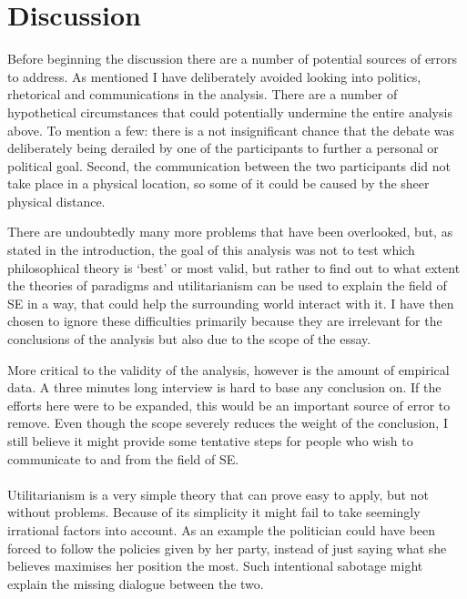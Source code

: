 \documentclass{article}
\begin{document}
\section{Discussion} \label{Discussion}
Before beginning the discussion there are a number of potential sources of errors to address. As mentioned I have deliberately avoided looking into politics, rhetorical and communications in the analysis. There are a number of hypothetical circumstances that could potentially undermine the entire analysis above. To mention a few: there is a not insignificant chance that the debate was deliberately being derailed by one of the participants to further a personal or political goal. Second, the communication between the two participants did not take place in a physical location, so some of it could be caused by the sheer physical distance.

There are undoubtedly many more problems that have been overlooked, but, as stated in the introduction, the goal of this analysis was not to test which philosophical theory is `best' or most valid, but rather to find out to what extent the theories of paradigms and utilitarianism can be used to explain the field of SE in a way, that could help the surrounding world interact with it. I have then chosen to ignore these difficulties primarily because they are irrelevant for the conclusions of the analysis but also due to the scope of the essay. 

More critical to the validity of the analysis, however is the amount of empirical data. A three minutes long interview is hard to base any conclusion on. If the efforts here were to be expanded, this would be an important source of error to remove. Even though the scope severely reduces the weight of the conclusion, I still believe it might provide some tentative steps for people who wish to communicate to and from the field of SE.
\\
\\
Utilitarianism is a very simple theory that can prove easy to apply, but not without problems. Because of its simplicity it might fail to take seemingly irrational factors into account. As an example the politician could have been forced to follow the policies given by her party, instead of just saying what she believes maximises her position the most. Such intentional sabotage might explain the missing dialogue between the two.
\end{document}
